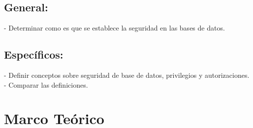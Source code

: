 \documentclass[%
 reprint,
 amsmath,amssymb,
 aps,
]{revtex4-1}
\begin{document}
\subsection{General:}
-  Determinar como es que se establece la seguridad en las bases de datos.
\subsection{Específicos:}
-  Definir conceptos sobre seguridad de base de datos, privilegios y autorizaciones.\\
- Comparar las definiciones.

\section {Marco Teórico}
\end{document}
